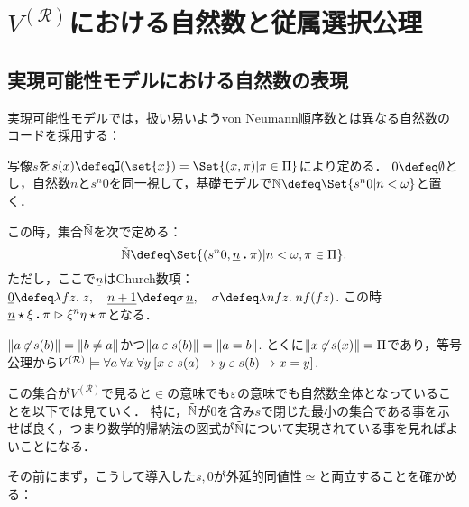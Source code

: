 \documentclass[realisability.tex]{subfiles}
\begin{document}
\section{$V^{(\mathcal{R})}$における自然数と従属選択公理}
\subsection{実現可能性モデルにおける自然数の表現}
実現可能性モデルでは，扱い易いようvon Neumann順序数とは異なる自然数のコードを採用する：

\begin{definition}
 写像$s$を$s(x) \defeq \gimel(\set{x}) = \Set{ (x, \pi) | \pi \in \Pi}$により定める．
 $0 \defeq \emptyset$とし，自然数$n$と$s^n 0$を同一視して，基礎モデルで$\mathbb{N} \defeq \Set{ s^n 0 | n < \omega}$と置く．

 この時，集合$\mathord{\tilde{\mathbb{N}}}$を次で定める：
 \[
  \NN \defeq \Set{ (s^n 0, \num{n} \push \pi) | n < \omega, \pi \in \Pi}.
 \]
 ただし，ここで$\underline{n}$はChurch数項：$\underline{0} \defeq \abs{f z}{z}, \quad \underline{n+1} \defeq \sigma \, \underline{n}, \quad \sigma \defeq \abs{n f z}{n f (f z)}$.
 この時$\underline{n} \mathbin{\star} \xi \mathbin{\boldsymbol{.}} \pi \mathrel{\rhd} \xi^n \eta \mathbin{\star} \pi$となる．
\end{definition}
\begin{remark}
 $\|a \not\mathrel{\varepsilon} s(b)\| = \|b \neq a\|$かつ$\|a \mathrel{\varepsilon} s(b)\| = \|a = b\|$.
 とくに$\|x \not\mathrel{\varepsilon} s(x)\| = \Pi$であり，等号公理から$V^{(\mathcal{R})} \models \forall a \: \forall x \: \forall y \: [x \mathrel{\varepsilon} s(a) \to y \mathrel{\varepsilon} s(b) \to x = y]$.
\end{remark}

この集合が$V^{(\mathcal{R})}$で見ると$\in$の意味でも$\mathrel{\varepsilon}$の意味でも自然数全体となっていることを以下では見ていく．
特に，$\mathord{\tilde{\mathbb{N}}}$が$0$を含み$s$で閉じた最小の集合である事を示せば良く，つまり数学的帰納法の図式が$\mathord{\tilde{\mathbb{N}}}$について実現されている事を見ればよいことになる．

その前にまず，こうして導入した$s, 0$が外延的同値性$\simeq$と両立することを確かめる：
\end{document}
